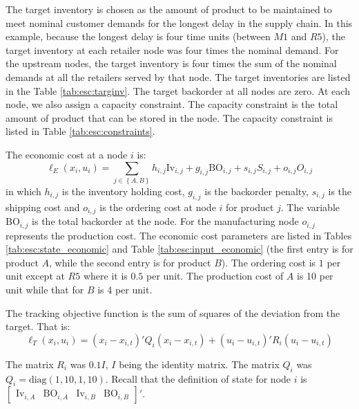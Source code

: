 \documentclass{elsarticle}
\newcommand{\set}[1]{\left\lbrace #1 \right\rbrace}
\newcommand{\BO}{\textrm{BO}}
\newcommand{\Inv}{\textrm{Iv}}
\theoremstyle{definition}
\begin{document}
The target inventory is chosen as the amount of product to be
maintained to meet nominal customer demands for the longest delay in
the supply chain. In this example, because the longest delay is four time
units (between $M1$ and $R5$), the target inventory at each retailer
node was four times the nominal demand. For the upstream nodes, the
target inventory is four times the sum of the nominal demands at all
the retailers served by that node.  The target inventories are
listed in the Table \ref{tab:esc:targinv}.  The target backorder at
all nodes are zero. At each node, we also assign a capacity
constraint. The capacity constraint is the total amount of product
that can be stored in the node. The capacity constraint is listed in
Table \ref{tab:esc:constraints}.   

The economic  cost at a node $i$ is:
\[ \ell_E(x_i,u_i) =  \sum_{j \in \set{A,B}}h_{i,j} \Inv_{i,j} + g_{i,j} \BO_{i,j} + s_{i,j} S_{i,j} + o_{i,j} O_{i,j} \]
in which $h_{i,j}$ is the inventory holding cost, $g_{i,j}$ is the backorder penalty, $s_{i,j}$ is the shipping cost and $o_{i,j}$ is the ordering cost at node $i$ for product $j$.  The variable $\BO_{i,j}$ is the total backorder at the node. For the manufacturing node $o_{i,j}$ represents the production cost. The economic cost parameters are listed in Tables \ref{tab:esc:state_economic} and Table \ref{tab:esc:input_economic} (the first entry is for product $A$, while the second entry is for product $B$).  The ordering cost is $1$ per unit except at $R5$ where it is $0.5$ per unit. The production cost of $A$ is 10 per unit while that for $B$ is 4 per unit.


The tracking objective function is the sum of squares of the deviation from the target. That is:
\[\ell_T(x_i,u_i) = (x_i-x_{i,t})'Q_i( x_i-x_{i,t}) + (u_i-u_{i,t})'R_i(u_i-u_{i,t})\]

The matrix $R_i$ was $0.1I$, $I$ being the identity matrix. The matrix
$Q_i$ was $Q_i = \text{diag}(1,10,1,10)$. Recall that the definition
of state for node $i$ is $\begin{bmatrix} \Inv_{i,A} & \BO_{i,A} &
  \Inv_{i,B} &   \BO_{i,B} \end{bmatrix}'$. 
\end{document}
